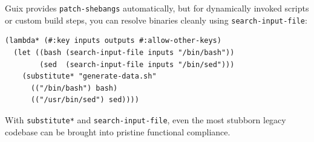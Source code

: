 Guix provides \texttt{patch-shebangs} automatically, but for dynamically invoked scripts or custom build steps, you can resolve binaries cleanly using \texttt{search-input-file}:

\begin{lstlisting}[style=guixscheme]
(lambda* (#:key inputs outputs #:allow-other-keys)
  (let ((bash (search-input-file inputs "/bin/bash"))
        (sed  (search-input-file inputs "/bin/sed")))
    (substitute* "generate-data.sh"
      (("/bin/bash") bash)
      (("/usr/bin/sed") sed))))
\end{lstlisting}

With \texttt{substitute*} and \texttt{search-input-file}, even the most stubborn legacy codebase can be brought into pristine functional compliance.
